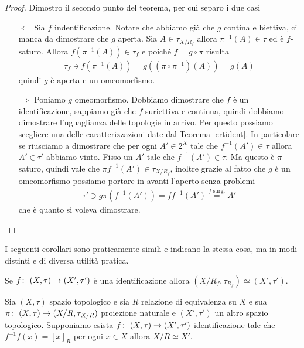 \begin{proof}
	Dimostro il secondo punto del teorema, per cui separo i due casi
	\begin{enumerate}
		\item[$\Leftarrow$] Sia $f$ indentificazione. Notare che abbiamo già che $g$ contina e biettiva, ci manca da dimostrare che $g$ aperta.  Sia $A \in \tau_{X/R_f}$ allora $\pi^{-1}(A) \in \tau$ ed è $f$-saturo. Allora $f(\pi^{-1}(A)) \in \tau_f$ e poiché $f = g \circ \pi$ risulta 
		\begin{equation}
		\begin{aligned}	
			 \tau_f \ni f(\pi^{-1}(A)) = g ((\pi \circ \pi^{-1})(A)) = g(A)
		\end{aligned}
		\end{equation}
		quindi $g$ è aperta e un omeomorfismo.
		\item[$\Rightarrow$] Poniamo $g$ omeomorfismo. Dobbiamo dimostrare che $f$ è un identificazione, sappiamo già che $f$ suriettiva e continua, quindi dobbiamo dimostrare l'uguaglianza delle  topologie in arrivo. Per questo possiamo scegliere una delle caratterizzazioni date dal Teorema \ref{crtident}. In particolare se riusciamo a dimostrare che per ogni $A' \in 2^X$ tale che $f^{-1}(A') \in \tau$ allora $A' \in \tau'$ abbiamo vinto. Fisso un $A'$ tale che $f^{-1}(A') \in \tau$. Ma questo è $\pi$-saturo, quindi vale che $\pi f^{-1} (A') \in \tau_{X/R_f}$, inoltre grazie al fatto che $g$ è un omeomorfismo possiamo portare in avanti l'aperto senza problemi
		\begin{equation}
		\begin{aligned}
			\tau' \ni g\pi (f^{-1}(A')) = ff^{-1}(A') \overset{f \; \text{surg.}}{=} A' 
		\end{aligned}
		\end{equation}
		che è quanto si voleva dimostrare.
	\end{enumerate}
\end{proof}

I seguenti corollari sono praticamente simili e indicano la stessa cosa, ma in modi distinti e di diversa utilità pratica. 

\begin{corollary}
	Se $f \colon\ (X,\tau) \rightarrow (X',\tau')$ è una identificazione allora $(X/R_f, \tau_{R_f}) \simeq (X', \tau')$. 
\end{corollary}

\begin{corollary}
	Sia $(X,\tau)$ spazio topologico e sia $R$ relazione di equivalenza su $X$ e sua $\pi \colon\ (X,\tau) \rightarrow (X/R, \tau_{X/R})$ proiezione naturale e $(X', \tau')$ un altro spazio topologico. Supponiamo esista $f \colon\ (X,\tau) \rightarrow (X',\tau')$ identificazione tale che $f^{-1}f(x) = \left[x\right]_R$ per ogni $x \in X$ allora $X/R \simeq X'$.
\end{corollary}

